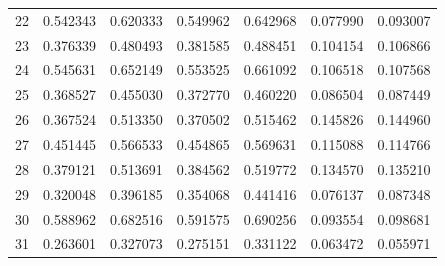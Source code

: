 \begin{tabular}{rrrrrrr}
22 & 0.542343 & 0.620333 & 0.549962 & 0.642968 & 0.077990 & 0.093007 \\
23 & 0.376339 & 0.480493 & 0.381585 & 0.488451 & 0.104154 & 0.106866 \\
24 & 0.545631 & 0.652149 & 0.553525 & 0.661092 & 0.106518 & 0.107568 \\
25 & 0.368527 & 0.455030 & 0.372770 & 0.460220 & 0.086504 & 0.087449 \\
26 & 0.367524 & 0.513350 & 0.370502 & 0.515462 & 0.145826 & 0.144960 \\
27 & 0.451445 & 0.566533 & 0.454865 & 0.569631 & 0.115088 & 0.114766 \\
28 & 0.379121 & 0.513691 & 0.384562 & 0.519772 & 0.134570 & 0.135210 \\
29 & 0.320048 & 0.396185 & 0.354068 & 0.441416 & 0.076137 & 0.087348 \\
30 & 0.588962 & 0.682516 & 0.591575 & 0.690256 & 0.093554 & 0.098681 \\
31 & 0.263601 & 0.327073 & 0.275151 & 0.331122 & 0.063472 & 0.055971 \\
\bottomrule
\end{tabular}
